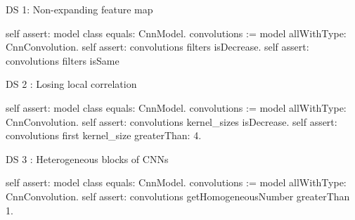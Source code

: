 DS 1: Non-expanding feature map

self assert: model class equals: CnnModel.
convolutions := model allWithType: CnnConvolution.
self assert: convolutions filters isDecrease.
self assert: convolutions filters isSame


DS 2 : Losing local correlation

self assert: model class equals: CnnModel.
convolutions := model allWithType: CnnConvolution.
self assert: convolutions kernel_sizes isDecrease.
self assert: convolutions first kernel_size greaterThan: 4.

DS 3 : Heterogeneous blocks of CNNs

self assert: model class equals: CnnModel.
convolutions := model allWithType: CnnConvolution.
self assert: convolutions getHomogeneousNumber greaterThan 1.









